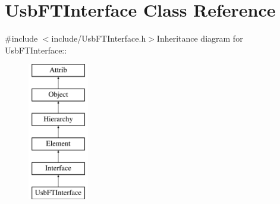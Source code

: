 \hypertarget{classUsbFTInterface}{
\section{UsbFTInterface Class Reference}
\label{classUsbFTInterface}
}


{\ttfamily \#include $<$include/UsbFTInterface.h$>$}Inheritance diagram for UsbFTInterface::\begin{figure}[H]
\begin{center}
\leavevmode
\includegraphics[height=6cm]{classUsbFTInterface}
\end{center}
\end{figure}
